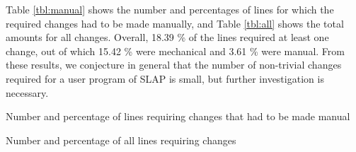 \documentclass[10pt,a4paper]{article}
\begin{document}
Table \ref{tbl:manual} shows the number and percentages of lines for which the required
changes had to be made manually, and Table \ref{tbl:all} shows the total amounts for all changes.
Overall, 18.39 \% of the lines required at least one change, out of which 15.42 \% were
mechanical and 3.61 \% were manual. From these results, we conjecture in general that
the number of non-trivial changes required for a user program of SLAP is small,
but further investigation is necessary.
\begin{table}[tbp]
  \caption{Number and percentage of lines requiring changes that had to be made manual}
  \label{tbl:manual}
  \centering
  {\footnotesize}
\end{table}
\begin{table}[tbp]
  \caption{Number and percentage of all lines requiring changes}
  \label{tbl:all}
  \centering
  {\footnotesize}
\end{table}
\end{document}
